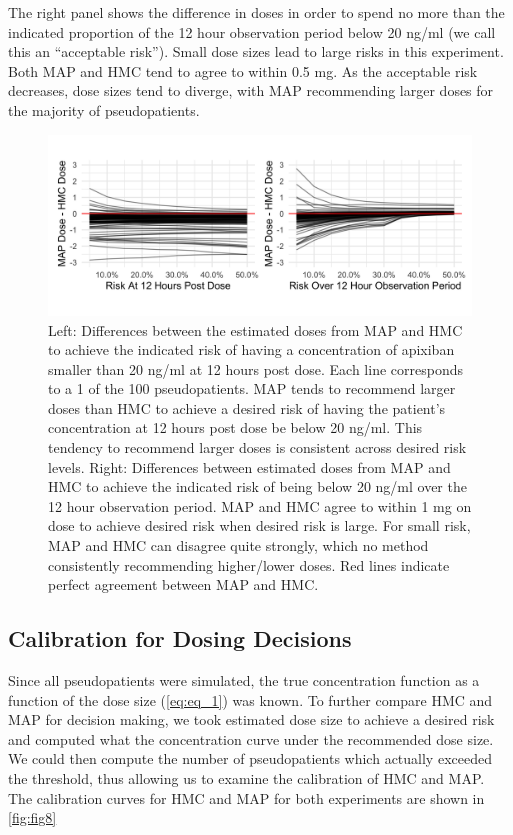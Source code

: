 The right panel shows the difference in doses in order to spend no more than the indicated proportion of the 12 hour observation period below 20 ng/ml (we call this an “acceptable risk”).  Small dose sizes lead to large risks in this experiment.  Both MAP and HMC tend to agree to within 0.5 mg.  As the acceptable risk decreases, dose sizes tend to diverge, with MAP recommending larger doses for the majority of pseudopatients.

\begin{figure}
	\centering
	\includegraphics[width=\linewidth]{figs/experiments}
	\caption{Left: Differences between the estimated doses from MAP and HMC to achieve the indicated risk of having a concentration of apixiban smaller than 20 ng/ml at 12 hours post dose. Each line corresponds to a 1 of the 100 pseudopatients. MAP tends to recommend larger doses than HMC to achieve a desired risk of having the patient's concentration at 12 hours post dose be below 20 ng/ml. This tendency to recommend larger doses is consistent across desired risk levels.  Right: Differences between estimated doses from MAP and HMC to achieve the indicated risk of being below 20 ng/ml over the 12 hour observation period.  MAP and HMC agree to within 1 mg on dose to achieve desired risk when desired risk is large.  For small risk, MAP and HMC can disagree quite strongly, which no method consistently recommending  higher/lower doses.  Red lines indicate perfect agreement between MAP and HMC.}
	\label{fig:fig7}
\end{figure}


\subsection*{Calibration for Dosing Decisions}

Since all pseudopatients were simulated, the true concentration function as a function of the dose size (\cref{eq:eq_1}) was known.  To further compare HMC and MAP for decision making, we took estimated dose size to achieve a desired risk and computed what the concentration curve under the recommended dose size.  We could then compute the number of pseudopatients which actually exceeded the threshold, thus allowing us to examine the calibration of HMC and MAP.  The calibration curves for HMC and MAP for both experiments are shown in \cref{fig:fig8}

